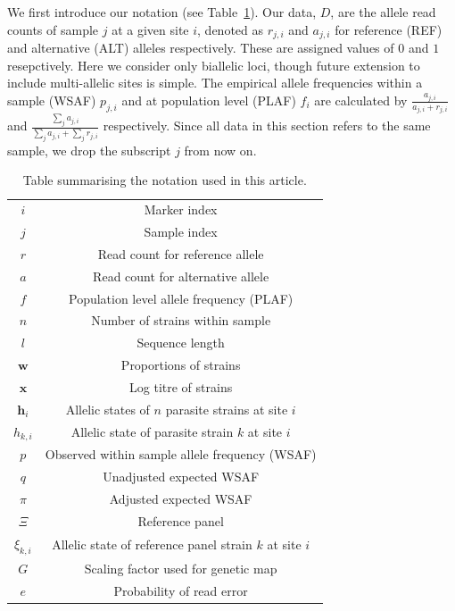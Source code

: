 \documentclass{bioinfo}
\begin{document}
We first introduce our notation (see Table~\ref{tab:notation}). Our data, $D$, are the allele read counts of sample $j$ at a given site $i$, denoted as $r_{j,i}$ and $a_{j,i}$ for reference (REF) and alternative (ALT) alleles respectively.  These are assigned values of $0$ and $1$ resepctively. Here we consider only biallelic loci, though future extension to include multi-allelic sites is simple.  The empirical allele frequencies within a sample (WSAF) $p_{j,i}$ and at population level (PLAF) $f_i$ are calculated by $ \frac{a_{j,i}}{a_{j,i} + r_{j,i}}$ and $ \frac{\sum_j a_{j,i}}{\sum_j a_{j,i} + \sum_j r_{j,i}}$ respectively. Since all data in this section refers to the same sample, we drop the subscript $j$ from now on.

\begin{table}[htb]\centering
\begin{tabular}{c|c}\hline
$i$              & Marker index\\
$j$              & Sample index \\
$r$              & Read count for reference allele \\
$a$              & Read count for alternative allele \\
$f$              & Population level allele frequency (PLAF) \\
$n$              & Number of strains within sample \\
$l$              & Sequence length \\
$\mathbf{w}$      & Proportions of strains \\
$\mathbf{x}$	& Log titre of strains \\
$\mathbf{h}_{i}$ & Allelic states of $n$ parasite strains at site $i$ \\
$h_{k,i}$   & Allelic state of parasite strain $k$ at site $i$\\
$p$              & Observed within sample allele frequency (WSAF) \\
$q$              & Unadjusted expected WSAF  \\
$\pi$            & Adjusted expected WSAF \\
$\Xi$            & Reference panel\\
$\xi_{k,i}$     & Allelic state of reference panel strain $k$ at site $i$\\
$G$              & Scaling factor used for genetic map\\
$e$              & Probability of read error\\ \hline
\end{tabular}
\caption{Table summarising the notation used in this article.}\label{tab:notation}
\end{table}
\end{document}
